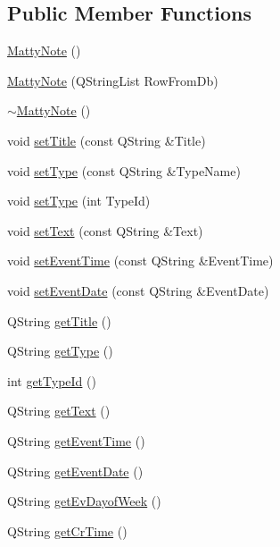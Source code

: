 \subsection*{Public Member Functions}
\begin{DoxyCompactItemize}
\item 
\hyperlink{classMattyNote_a8c09bf366e6973bc1c4f4d5daa792899}{Matty\+Note} ()
\item 
\hyperlink{classMattyNote_a101e9c2475ee2567dfa2e168b543806f}{Matty\+Note} (Q\+String\+List Row\+From\+Db)
\item 
\hyperlink{classMattyNote_a2831641523b4a0d5c36100689f95c912}{$\sim$\+Matty\+Note} ()
\item 
void \hyperlink{classMattyNote_af7909f64608b020b501019cf29796eb0}{set\+Title} (const Q\+String \&Title)
\item 
void \hyperlink{classMattyNote_ac9171fd4faaf0c286c9315a0b4ef4560}{set\+Type} (const Q\+String \&Type\+Name)
\item 
void \hyperlink{classMattyNote_a8ae86d728b9cb64fa78042a09cb5aa70}{set\+Type} (int Type\+Id)
\item 
void \hyperlink{classMattyNote_afa0c4ee32401e4a09e8d04fd0b01da0b}{set\+Text} (const Q\+String \&Text)
\item 
void \hyperlink{classMattyNote_aaeba8670420ab9ad0fb8be660845e0ba}{set\+Event\+Time} (const Q\+String \&Event\+Time)
\item 
void \hyperlink{classMattyNote_a70676b1ab215b873c9451a82cc417684}{set\+Event\+Date} (const Q\+String \&Event\+Date)
\item 
Q\+String \hyperlink{classMattyNote_acb4af77f4177a0b17f140d4b4421e32e}{get\+Title} ()
\item 
Q\+String \hyperlink{classMattyNote_ad07b65692d79cf25e5c9008e111bd999}{get\+Type} ()
\item 
int \hyperlink{classMattyNote_af5b90028a8e406e41b8c8a6de83685ef}{get\+Type\+Id} ()
\item 
Q\+String \hyperlink{classMattyNote_a9213ac15a09625f59a95ede1b1470308}{get\+Text} ()
\item 
Q\+String \hyperlink{classMattyNote_a8c7f06ff44ce23f5a9ce6d2364732a24}{get\+Event\+Time} ()
\item 
Q\+String \hyperlink{classMattyNote_a8973578029ab29593061cca235ae84f9}{get\+Event\+Date} ()
\item 
Q\+String \hyperlink{classMattyNote_ac6f675c525f027536fdcfda43f0a261e}{get\+Ev\+Dayof\+Week} ()
\item 
Q\+String \hyperlink{classMattyNote_a2acf19aded7d4b5c29db7af6b0c4b1f6}{get\+Cr\+Time} ()

\end{DoxyCompactItemize}
